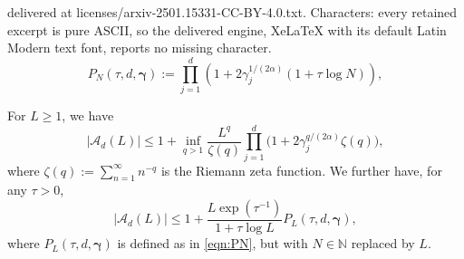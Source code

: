 \documentclass[10pt,a4paper]{amsart}
\newcommand{\Acal}{\mathcal{A}}
\newcommand{\NN}{\mathbb{N}}
\newcommand{\bsgamma}{\boldsymbol{\gamma}}
\begin{document}
delivered at licenses/arxiv-2501.15331-CC-BY-4.0.txt. Characters: every retained excerpt is pure ASCII, so the delivered engine, XeLaTeX with its default Latin Modern text font, reports no missing character.
        \begin{equation}\label{eqn:PN}
        P_N(\tau,d,\bsgamma):=\prod_{j=1}^d \left(1+ 2\gamma_j^{1/(2\alpha)} (1+\tau\log N)\right),
        \end{equation}

\begin{lemma}\label{lem:Adcount} 
For $L\geq 1$, we have  
\begin{equation}\label{eqn:minoverq}
    |\Acal_d(L)|\leq 1+ \inf_{q> 1} \frac{L^{q}}{\zeta(q)} \prod_{j=1}^d \Big(1+2\gamma^{q/(2\alpha)}_j \zeta(q)\Big),
\end{equation}
where  $\zeta(q):=\sum_{n=1}^\infty n^{-q}$ is the Riemann zeta function. 
We further have, for any $\tau>0$,
    \begin{equation}\label{eqn:Adbound}
        |\Acal_d(L)|\leq 1+\frac{ L\exp(\tau^{-1})}{1+\tau\log {L} }P_{L}(\tau,d,\bsgamma),
    \end{equation}
    where $P_{L}(\tau,d,\bsgamma)$ is defined as in \eqref{eqn:PN}, but with $N\in\NN$ replaced by $L$.
\end{lemma}
\end{document}
